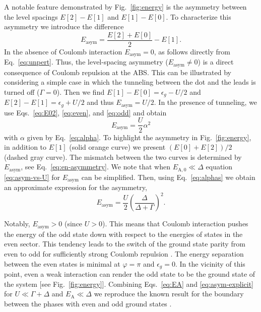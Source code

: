 \documentclass[aps,reprint,longbibliography, prb]{revtex4-2}
\begin{document}
A notable feature demonstrated by Fig.~\ref{fig:energy} is the asymmetry between the level spacings $E[2] - E[1]$ and $E[1] - E[0]$. To characterize this asymmetry we introduce the difference
\begin{equation}
    \label{eq:en-asymmetry}
    E_\mathrm{asym} =\frac{E[2]+E[0]}{2}-E[1].
\end{equation}
In the absence of Coulomb interaction $E_\mathrm{asym} = 0$, as follows directly from Eq.~\eqref{eq:unpert}. Thus, the level-spacing asymmetry ($E_\mathrm{asym} \neq 0$) is a direct consequence of Coulomb repulsion at the ABS. This can be illustrated by considering a simple case in which the tunneling between the dot and the leads is turned off ($\Gamma=0$). Then we find $E[1] - E[0] = \epsilon_g - U/2$ and $E[2] - E[1] = \epsilon_g + U/2$ and thus $E_\mathrm{asym} = U/2$. In the presence of tunneling, we use  Eqs.~\eqref{eq:E02}, \eqref{eq:even}, and \eqref{eq:odd} and obtain
\begin{equation}
    \label{eq:asym-vs-U}
    E_\mathrm{asym} = \frac{U}{2}\alpha^2
\end{equation}
with $\alpha$ given by Eq.~\eqref{eq:alpha}. To highlight the asymmetry in Fig.~\ref{fig:energy}, in addition to $E[1]$ (solid orange curve) we present $(E[0] + E[2])/2$ (dashed gray curve). The mismatch between the two curves is determined by $E_\mathrm{asym}$, see Eq.~\eqref{eq:en-asymmetry}. We note that when $E_\mathrm{A,0}\ll\Delta$ equation \eqref{eq:asym-vs-U} for $E_\mathrm{asym}$ can be simplified. Then, using Eq.~\eqref{eq:alphas} we obtain an approximate expression for the asymmetry,
\begin{equation}
    \label{eq:asym-explicit}
    E_\mathrm{asym} = \frac{U}{2}\left(\frac{\Delta}{\Delta+\Gamma}\right)^2.
\end{equation}

Notably, $E_\mathrm{asym}>0$ (since $U>0$). This means that Coulomb interaction pushes the energy of the odd state down with respect to the energies of states in the even sector. This tendency leads to the switch of the ground state parity from even to odd for sufficiently strong Coulomb repulsion \cite{yeyati2011}.
The energy separation between the even states is minimal at $\varphi = \pi$ and $\epsilon_g = 0$. In the vicinity of this point, even a weak interaction can render the odd state to be the ground state of the system [see Fig.~\ref{fig:energy}].
Combining Eqs.~\eqref{eq:EA} and \eqref{eq:asym-explicit} for $U\ll\Gamma + \Delta$ and $E_\mathrm{A}\ll\Delta$ we reproduce the known result for the boundary between the phases with even and odd ground states \cite{meng2009, novotny2015, novotny2019}.
\end{document}
